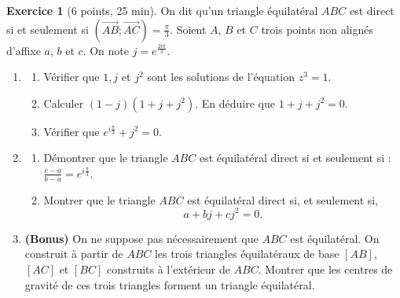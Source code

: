 \documentclass{exam}
\theoremstyle{definition}
\newtheorem{exercice}{Exercice}
\begin{document}
\begin{exercice}[6 points, 25 min]
On dit qu'un triangle équilatéral $ABC$ est direct si et seulement si $(\overrightarrow{AB}; \overrightarrow{AC}) = \frac{\pi}{3}$.
Soient \( A \), \( B \) et \( C \) trois points non alignés d’affixe \( a \), \( b \) et \( c \). On note \( j = e^{\frac{2i\pi}{3}} \).
\begin{enumerate}
    \item \begin{enumerate}
        \item Vérifier que $1, j$ et $j^2$ sont les solutions de l'équation $z^3 = 1$.
        \item Calculer $(1-j)(1 + j + j^2)$. En déduire que $1 + j + j^2 = 0$.
        \item Vérifier que $e^{i\frac{\pi}{3}} + j^2 = 0$.
    \end{enumerate}
    \item \begin{enumerate}
        \item Démontrer que le triangle $ABC$ est équilatéral direct si et seulement si : $\frac{c - a}{b - a} = e^{i\frac{\pi}{3}}$.
        \item Montrer que le triangle \( ABC \) est équilatéral direct si, et seulement si,
        \[
        a + bj + cj^2 = 0.
        \]
    \end{enumerate}
    \item \textbf{(Bonus)} On ne suppose pas nécessairement que \( ABC \) est équilatéral. On construit à partir de \( ABC \) les trois triangles équilatéraux de base \([AB]\), \([AC]\) et \([BC]\) construits à l’extérieur de \( ABC \). Montrer que les centres de gravité de ces trois triangles forment un triangle équilatéral.
\end{enumerate}
\end{exercice}

%
\end{document}
